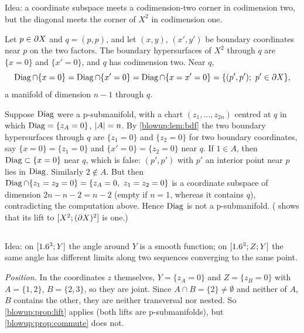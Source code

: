 \subsection*{}
Idea: a coordinate subspace meets a codimension-two corner in codimension two, but the
diagonal meets the corner of $X^2$ in codimension one.

Let $p\in\partial X$ and $q=(p,p)$, and let $(x,y)$, $(x',y')$ be boundary coordinates near $p$ on the
two factors. The boundary hypersurfaces of $X^2$ through $q$ are $\{x=0\}$ and $\{x'=0\}$, and
$q$ has codimension two. Near $q$,
\begin{equation*}
  \Diag\cap\{x=0\}=\Diag\cap\{x'=0\}=\Diag\cap\{x=x'=0\}=\{(p',p');\ p'\in\pa X\},
\end{equation*}
a manifold of dimension $n-1$ through $q$.

Suppose $\operatorname{Diag}$ were a p-submanifold, with a chart $(z_1,\dots,z_{2n})$ centred at $q$ in which
$\operatorname{Diag}=\{z_A=0\}$, $\lvert A\rvert=n$. By \cref{blowup:lem:bdf} the two boundary hypersurfaces through
$q$ are $\{z_1=0\}$ and $\{z_2=0\}$ for two boundary coordinates, say $\{x=0\}=\{z_1=0\}$ and
$\{x'=0\}=\{z_2=0\}$ near $q$. If $1\in A$, then $\operatorname{Diag}\subset\{x=0\}$ near $q$, which is false:
$(p',p')$ with $p'$ an interior point near $p$ lies in $\operatorname{Diag}$. Similarly $2\notin A$. But then
$\Diag\cap\{z_1=z_2=0\}=\{z_A=0,\ z_1=z_2=0\}$ is a coordinate subspace of dimension
$2n-n-2=n-2$ (empty if $n=1$, whereas it contains $q$), contradicting the computation above.
Hence $\operatorname{Diag}$ is not a p-submanifold. ( shows that its lift to
$[X^2;(\partial X)^2]$ is one.)

\subsection*{}
Idea: on $[1.6^3;Y]$ the angle around $Y$ is a smooth function; on $[1.6^3;Z;Y]$ the same
angle has different limits along two sequences converging to the same point.

\emph{Position.} In the coordinates $z$ themselves, $Y=\{z_A=0\}$ and $Z=\{z_B=0\}$ with
$A=\{1,2\}$, $B=\{2,3\}$, so they are joint. Since $A\cap B=\{2\}\ne\emptyset$ and neither of
$A$, $B$ contains the other, they are neither transversal nor nested. So
\cref{blowup:prop:lift} applies (both lifts are p-submanifolds), but
\cref{blowup:prop:commute} does not.

